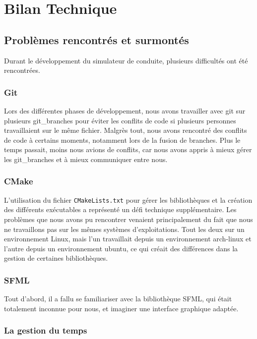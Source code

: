 \section{Bilan Technique}\label{sec:bilan-technique}

\subsection{Problèmes rencontrés et surmontés}\label{subsec:problemes-rencontres-et-surmontes}
Durant le développement du simulateur de conduite, plusieurs difficultés ont été rencontrées.

\subsubsection{Git}\label{subsubsec:git}
Lors des différentes phases de développement, nous avons travailler avec \gls{git} sur plusieurs \gls{git_branches} pour éviter les conflits de code si plusieurs personnes travaillaient sur le même fichier.
Malgrès tout, nous avons rencontré des conflits de code à certains moments, notamment lors de la fusion de branches.
Plus le temps passait, moins nous avions de conflits, car nous avons appris à mieux gérer les \gls{git_branches} et à mieux communiquer entre nous.

\subsubsection{CMake}\label{subsubsec:cmake}
L'utilisation du fichier \texttt{CMakeLists.txt} pour gérer les bibliothèques et la création des différents exécutables a représenté un défi technique supplémentaire.
Les problèmes que nous avons pu rencontrer venaient principalement du fait que nous ne travaillons pas sur les mêmes systèmes d'exploitations.
Tout les deux sur un environnement Linux, mais l'un travaillait depuis un environnement \gls{arch-linux} et l'autre depuis un environnement \gls{ubuntu}, ce qui créait des différences dans la gestion de certaines bibliothèques.

\subsubsection{SFML}\label{subsubsec:SFML}
Tout d'abord, il a fallu se familiariser avec la bibliothèque SFML, qui était totalement inconnue pour nous, et imaginer une interface graphique adaptée.

\subsubsection{La gestion du temps}\label{subsubsec:la-gestion-du-temps}


